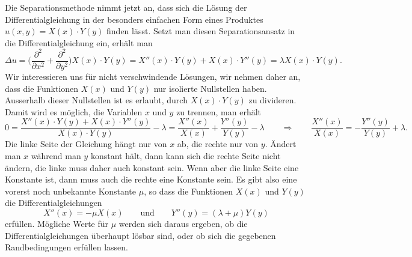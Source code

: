 Die Separationsmethode nimmt jetzt an, dass sich die Lösung der
Differentialgleichung in der besonders einfachen Form eines Produktes
$u(x,y)=X(x)\cdot Y(y)$ finden lässt.
Setzt man diesen Separationsansatz
in die Differentialgleichung ein, erhält man
\[
\Delta u
=
\biggl(
\frac{\partial^2}{\partial x^2}
+
\frac{\partial^2}{\partial y^2}
\biggr)
X(x)\cdot Y(y)
=
X''(x)\cdot Y(y) + X(x)\cdot Y''(y)
=
\lambda X(x)\cdot Y(y).
\]
Wir interessieren uns für nicht verschwindende Lösungen, wir nehmen daher
an, dass die Funktionen $X(x)$ und $Y(y)$ nur isolierte Nullstellen haben.
Ausserhalb dieser Nullstellen ist es erlaubt, durch $X(x)\cdot Y(y)$ zu
divideren. 
Damit wird es möglich, die Variablen $x$ und $y$ zu trennen, man
erhält
\[
0
=
\frac{X''(x)\cdot Y(y) + X(x)\cdot Y''(y)}{X(x)\cdot Y(y)} - \lambda
=
\frac{X''(x)}{X(x)}
+
\frac{Y''(y)}{Y(y)}
-
\lambda
\qquad\Rightarrow\qquad
\frac{X''(x)}{X(x)}=-\frac{Y''(y)}{Y(y)}+\lambda.
\]
Die linke Seite der Gleichung hängt nur von $x$ ab, die rechte nur von $y$.
Ändert man $x$ während man $y$ konstant hält, dann kann sich die rechte
Seite nicht ändern, die linke muss daher auch konstant sein.
Wenn aber die linke Seite eine Konstante ist, dann muss auch die rechte
eine Konstante sein. 
Es gibt also eine vorerst noch unbekannte Konstante $\mu$, so dass
die Funktionen $X(x)$ und $Y(y)$ die Differentialgleichungen
\begin{equation}
X''(x) = -\mu X(x)
\qquad\text{und}\qquad
Y''(y) = (\lambda+\mu)Y(y)
\label{skript:separation:gleichungen}
\end{equation}
erfüllen.
Mögliche Werte für $\mu$ werden sich daraus ergeben, ob die
Differentialgleichungen überhaupt lösbar sind, oder ob
sich die gegebenen Randbedingungen erfüllen lassen.

